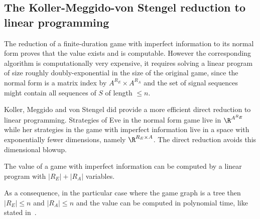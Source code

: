 \subsection{The Koller-Meggido-von Stengel reduction to linear programming}
\label{8-subsec:reduction_linear_programming}

The reduction of a finite-duration game with imperfect information
to its normal form proves that the value exists and
is computable.
However the corresponding algorithm is computationally
very expensive, it requires solving
a linear program of size roughly doubly-exponential in the size 
of the original game, since the normal form is a matrix
index by $A^{R_E} \times A^{R_A}$ and the set of signal sequences
might contain all sequences of $S$ of length $\leq n$.

Koller, Meggido and von Stengel did provide a
more efficient direct reduction to linear programming.
Strategies of Eve in the normal form game live
in $\R^{A^{R_E}}$
while her strategies in the game with imperfect information
live in a space
with exponentially fewer dimensions, namely
$\R^{R_E\times A}$.
The direct reduction avoids this dimensional blowup.


\begin{theorem}
The value of a game with imperfect information
can be computed by a linear program with
$|R_E| + |R_A|$ variables.
\end{theorem}

As a consequence, in the particular case where the game graph is a tree
then $|R_E|\leq n$ and $|R_A|\leq n$
and the value can be computed in polynomial time,
like stated in~\cite{stengel}.

